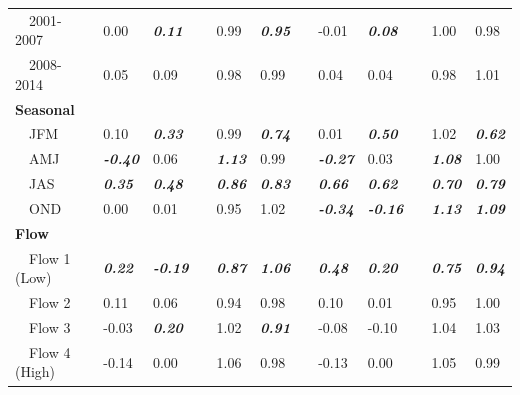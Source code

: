\documentclass[letterpaper,12pt,oneside]{article}\usepackage[]{graphicx}\usepackage[]{color}
\begin{document}
\begin{table}[!tbp]
\begin{center}
\begin{tabular}{lllcllcllcll}
~~2001-2007&0.00&{\bf \textit{0.11}}&&0.99&{\bf \textit{0.95}}&&-0.01&{\bf \textit{0.08}}&&1.00&0.98\tabularnewline
~~2008-2014&0.05&0.09&&0.98&0.99&&0.04&0.04&&0.98&1.01\tabularnewline
\hline
{\bfseries Seasonal}&&&&&&&&&&&\tabularnewline
~~JFM&0.10&{\bf \textit{0.33}}&&0.99&{\bf \textit{0.74}}&&0.01&{\bf \textit{0.50}}&&1.02&{\bf \textit{0.62}}\tabularnewline
~~AMJ&{\bf \textit{-0.40}}&0.06&&{\bf \textit{1.13}}&0.99&&{\bf \textit{-0.27}}&0.03&&{\bf \textit{1.08}}&1.00\tabularnewline
~~JAS&{\bf \textit{0.35}}&{\bf \textit{0.48}}&&{\bf \textit{0.86}}&{\bf \textit{0.83}}&&{\bf \textit{0.66}}&{\bf \textit{0.62}}&&{\bf \textit{0.70}}&{\bf \textit{0.79}}\tabularnewline
~~OND&0.00&0.01&&0.95&1.02&&{\bf \textit{-0.34}}&{\bf \textit{-0.16}}&&{\bf \textit{1.13}}&{\bf \textit{1.09}}\tabularnewline
\hline
{\bfseries Flow}&&&&&&&&&&&\tabularnewline
~~Flow 1 (Low)&{\bf \textit{0.22}}&{\bf \textit{-0.19}}&&{\bf \textit{0.87}}&{\bf \textit{1.06}}&&{\bf \textit{0.48}}&{\bf \textit{0.20}}&&{\bf \textit{0.75}}&{\bf \textit{0.94}}\tabularnewline
~~Flow 2&0.11&0.06&&0.94&0.98&&0.10&0.01&&0.95&1.00\tabularnewline
~~Flow 3&-0.03&{\bf \textit{0.20}}&&1.02&{\bf \textit{0.91}}&&-0.08&-0.10&&1.04&1.03\tabularnewline
~~Flow 4 (High)&-0.14&0.00&&1.06&0.98&&-0.13&0.00&&1.05&0.99\tabularnewline
\hline
\end{tabular}\end{center}

\end{table}




\end{document}
